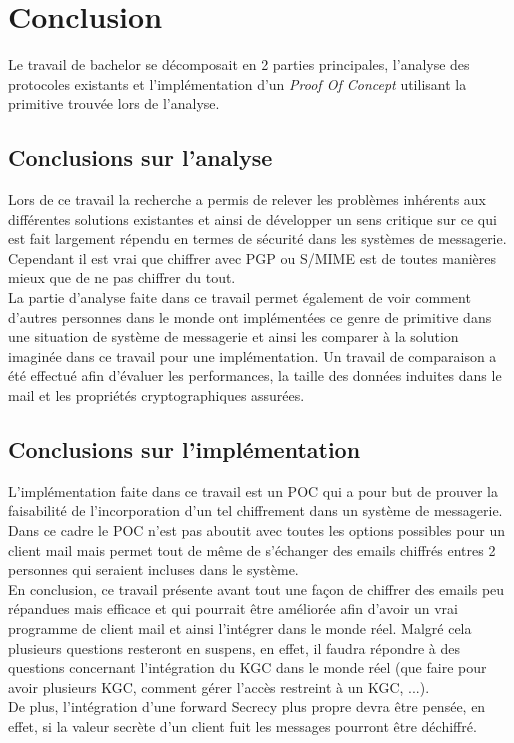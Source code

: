 \chapter{Conclusion}
\label{ch:conclusion}
Le travail de bachelor se décomposait en 2 parties principales, l'analyse des protocoles existants et l'implémentation d'un \textit{Proof Of Concept} utilisant la primitive trouvée lors de l'analyse.
\section{Conclusions sur l'analyse}
Lors de ce travail la recherche a permis de relever les problèmes inhérents aux différentes solutions existantes et ainsi de développer un sens critique sur ce qui est fait largement répendu en termes de sécurité dans les systèmes de messagerie. Cependant il est vrai que chiffrer avec PGP ou S/MIME est de toutes manières mieux que de ne pas chiffrer du tout.\\
La partie d'analyse faite dans ce travail permet également de voir comment d'autres personnes dans le monde ont implémentées ce genre de primitive dans une situation de système de messagerie et ainsi les comparer à la solution imaginée dans ce travail pour une implémentation. Un travail de comparaison a été effectué afin d'évaluer les performances, la taille des données induites dans le mail et les propriétés cryptographiques assurées.
\section{Conclusions sur l'implémentation}
L'implémentation faite dans ce travail est un POC qui a pour but de prouver la faisabilité de l'incorporation d'un tel chiffrement dans un système de messagerie. Dans ce cadre le POC n'est pas aboutit avec toutes les options possibles pour un client mail mais permet tout de même de s'échanger des emails chiffrés entres 2 personnes qui seraient incluses dans le système.\\
En conclusion, ce travail présente avant tout une façon de chiffrer des emails peu répandues mais efficace et qui pourrait être améliorée afin d'avoir un vrai programme de client mail et ainsi l'intégrer dans le monde réel. Malgré cela plusieurs questions resteront en suspens, en effet, il faudra répondre à des questions concernant l'intégration du KGC dans le monde réel (que faire pour avoir plusieurs KGC, comment gérer l'accès restreint à un KGC, ...).\\
De plus, l'intégration d'une forward Secrecy plus propre devra être pensée, en effet, si la valeur secrète d'un client fuit les messages pourront être déchiffré.